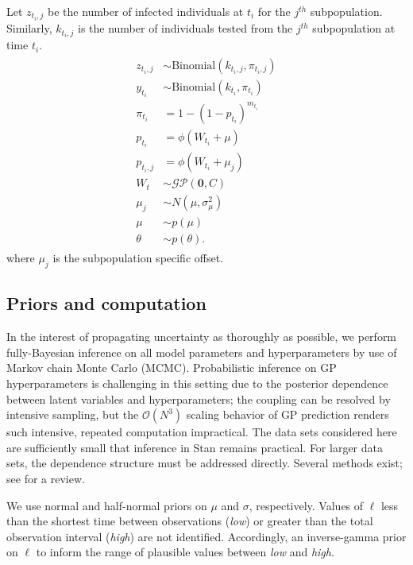 \documentclass{article}
\begin{document}
Let $z_{t_i,j}$ be the number of infected individuals at $t_i$ for the $j^{th}$ subpopulation. Similarly, $k_{t_i, j}$ is the number of individuals tested from the $j^{th}$ subpopulation at time $t_i$. 
\begin{align}
\begin{split} \label{eq:di}
    z_{t_i,j} & \sim \text{Binomial}(k_{t_i,j}, \pi_{t_i,j})\\
    y_{t_i} &\sim \text{Binomial}(k_{t_i}, \pi_{t_i}) \\
    \pi_{t_i} &= 1 - (1 - p_{t_i})^{m_{t_i}} \\
    p_{t_i} &= \phi(W_{t_i} + \mu) \\
        p_{t_i,j} &= \phi(W_{t_i} + \mu_j) \\
    W_t &\sim \mathcal{GP}(\mathbf{0}, C) \\
     \mu_j &\sim N(\mu, \sigma^2_\mu) \\
     \mu &\sim p(\mu) \\
    \theta &\sim p(\theta).
\end{split}
\end{align}
where $\mu_j$ is the subpopulation specific offset.

\subsection{Priors and computation}

In the interest of propagating uncertainty as thoroughly as possible, we perform fully-Bayesian inference on all model parameters and hyperparameters by use of Markov chain Monte Carlo (MCMC). Probabilistic inference on GP hyperparameters is challenging in this setting due to the posterior dependence between latent variables and hyperparameters; the coupling can be resolved by intensive sampling, but the $\mathcal{O}(N^3)$ scaling behavior of GP prediction renders such intensive, repeated computation impractical. The data sets considered here are sufficiently small that inference in Stan \cite{carpenter2017stan} remains practical. For larger data sets, the dependence structure must be addressed directly. Several methods exist; see \cite{filippone2013comparative} for a review.

We use normal and half-normal priors on $\mu$ and $\sigma$, respectively. Values of $\ell$ less than the shortest time between observations (\emph{low}) or greater than the total observation interval (\emph{high}) are not identified. Accordingly, an inverse-gamma prior on $\ell$ to inform the range of plausible values between \emph{low} and \emph{high}. 
\end{document}
